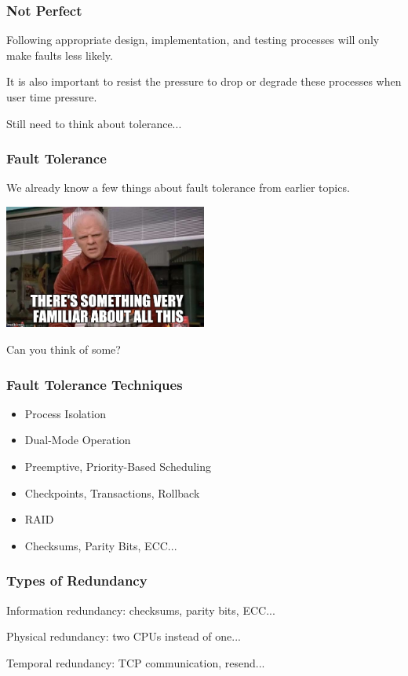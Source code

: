 \begin{frame}
\frametitle{Not Perfect}

Following appropriate design, implementation, and testing processes will only make faults less likely.

It is also important to resist the pressure to drop or degrade these processes when user time pressure.

Still need to think about tolerance...

\end{frame}

\begin{frame}
\frametitle{Fault Tolerance}

We already know a few things about fault tolerance from earlier topics.

\begin{center}
	\includegraphics[width=0.5\textwidth]{images/biff.jpg}
\end{center}

Can you think of some?

\end{frame}

\begin{frame}
\frametitle{Fault Tolerance Techniques}

\begin{itemize}
	\item Process Isolation
	\item Dual-Mode Operation
	\item Preemptive, Priority-Based Scheduling
	\item Checkpoints, Transactions, Rollback
	\item RAID
	\item Checksums, Parity Bits, ECC...
\end{itemize}

\end{frame}

\begin{frame}
\frametitle{Types of Redundancy}

\alert{Information redundancy}: checksums, parity bits, ECC...

\alert{Physical redundancy}: two CPUs instead of one...

\alert{Temporal redundancy}: TCP communication, resend...

\end{frame}

